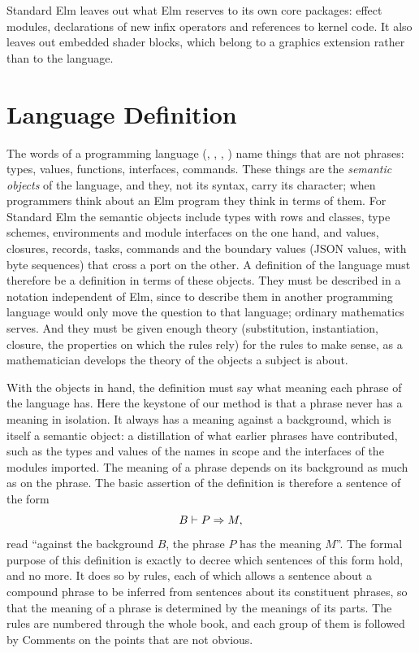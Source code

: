 Standard Elm leaves out what Elm reserves to its own core packages: effect
modules, declarations of new infix operators and references to kernel code.
It also leaves out embedded shader blocks, which belong to a graphics
extension rather than to the language.

\section*{Language Definition}

The words of a programming language (, , ,
) name things that are not phrases: types, values, functions,
interfaces, commands. These things are the \emph{semantic objects} of the
language, and they, not its syntax, carry its character; when programmers
think about an Elm program they think in terms of them. For Standard Elm the
semantic objects include types with rows and classes, type schemes,
environments and module interfaces on the one hand, and values, closures,
records, tasks, commands and the boundary values (JSON values, with byte
sequences) that cross a port on the other. %
A definition of the language must therefore be a definition in terms of
these objects. They must be described in a notation independent of Elm,
since to describe them in another programming language would only move the
question to that language; ordinary mathematics serves. And they must be
given enough theory (substitution, instantiation, closure, the properties on
which the rules rely) for the rules to make sense, as a mathematician
develops the theory of the objects a subject is about.

With the objects in hand, the definition must say what meaning each phrase
of the language has. Here the keystone of our method is that a phrase never
has a meaning in isolation. It always has a meaning against a background,
which is itself a semantic object: a distillation of what earlier phrases
have contributed, such as the types and values of the names in scope and the
interfaces of the modules imported. The meaning of a phrase depends on its
background as much as on the phrase. The basic assertion of the definition
is therefore a sentence of the form
\[
  B \vdash P \Rightarrow M,
\]
read ``against the background $B$, the phrase $P$ has the meaning $M$''. The
formal purpose of this definition is exactly to decree which sentences of
this form hold, and no more. It does so by rules, each of which allows a
sentence about a compound phrase to be inferred from sentences about its
constituent phrases, so that the meaning of a phrase is determined by the
meanings of its parts. The rules are numbered through the whole book, and
each group of them is followed by Comments on the points that are not
obvious.

